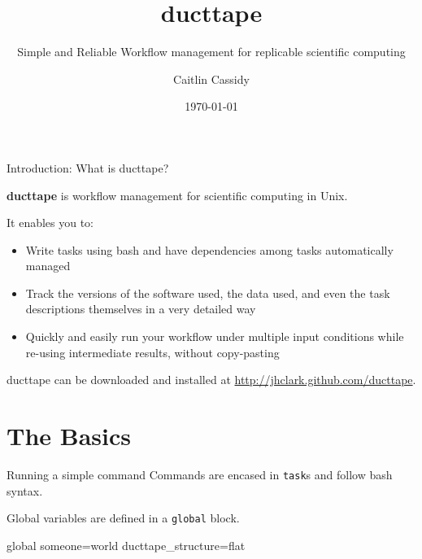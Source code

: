 \documentclass[10pt]{beamer}
\title{ducttape}
\subtitle{Simple and Reliable Workflow management for replicable scientific computing}
\date{\today}
\author{Caitlin Cassidy}
\institute{The University of Illinois at Urbana-Champaign}
\begin{document}
\maketitle



\begin{frame}[fragile]{Introduction: What is ducttape?}

  \textbf{ducttape} is workflow management for scientific computing in Unix.

  It enables you to:

  \begin{itemize}

  \item Write tasks using bash and have dependencies among tasks automatically managed
  \item Track the versions of the software used, the data used, and even the task descriptions themselves in a very detailed way
  \item Quickly and easily run your workflow under multiple input conditions while re-using intermediate results, without copy-pasting

  \end{itemize}

  ducttape can be downloaded and installed at \url{http://jhclark.github.com/ducttape}.

\end{frame}

\section{The Basics}

\begin{frame}[fragile]{Running a simple command}
Commands are encased in \texttt{task}s and follow bash syntax.
Global variables are defined in a \texttt{global} block.
\begin{code}
global {
  someone=world
  ducttape_structure=flat
}
\end{code}
\end{frame}
\end{document}
